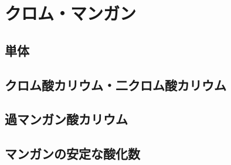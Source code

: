  \section{クロム・マンガン}
 \subsection{単体}
 \subsection{クロム酸カリウム・二クロム酸カリウム}
 \subsection{過マンガン酸カリウム}
 \subsection{マンガンの安定な酸化数}